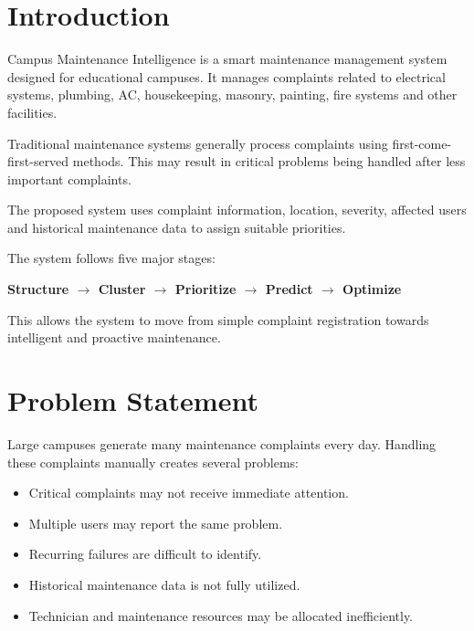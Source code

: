 \documentclass[12pt,a4paper]{article}
\begin{document}
\tableofcontents
\newpage


\section{Introduction}

Campus Maintenance Intelligence is a smart maintenance management system designed for educational campuses. It manages complaints related to electrical systems, plumbing, AC, housekeeping, masonry, painting, fire systems and other facilities.

Traditional maintenance systems generally process complaints using first-come-first-served methods. This may result in critical problems being handled after less important complaints.

The proposed system uses complaint information, location, severity, affected users and historical maintenance data to assign suitable priorities.

The system follows five major stages:

\begin{center}
\textbf{Structure $\rightarrow$ Cluster $\rightarrow$ Prioritize $\rightarrow$ Predict $\rightarrow$ Optimize}
\end{center}

This allows the system to move from simple complaint registration towards intelligent and proactive maintenance.



\section{Problem Statement}

Large campuses generate many maintenance complaints every day. Handling these complaints manually creates several problems:

\begin{itemize}
    \item Critical complaints may not receive immediate attention.
    \item Multiple users may report the same problem.
    \item Recurring failures are difficult to identify.
    \item Historical maintenance data is not fully utilized.
    \item Technician and maintenance resources may be allocated inefficiently.
\end{itemize}
\end{document}
